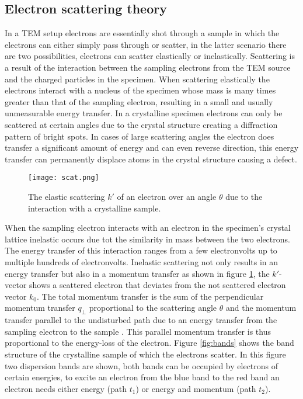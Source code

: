 \subsection{Electron scattering theory}
In a TEM setup electrons are essentially shot through a sample in which the electrons can either simply pass through or scatter, in the latter scenario there are two possibilities, electrons can scatter elastically or inelastically.
Scattering is a result of the interaction between the sampling electrons from the TEM source and the charged particles in the specimen.
When scattering elastically the electrons interact with a nucleus of the specimen whose mass is many times greater than that of the sampling electron, resulting in a small and usually unmeasurable energy transfer. In a crystalline specimen electrons can only be scattered at certain angles due to the crystal structure creating a diffraction pattern of bright spots. In cases of large scattering angles the electron does transfer a significant amount of energy and can even reverse direction, this energy transfer can permanently displace atoms in the crystal structure causing a defect.\cite{Egerton_2008,Egerton2011}\\
%
\begin{figure}[H]
	\centering
	\captionsetup{width=0.9\linewidth}
	\texttt{[image: scat.png]}
	\caption{The elastic scattering $k'$ of an electron over an angle $\theta$ due to the interaction with a crystalline sample.}
	\label{fig:scat}
\end{figure}
%
When the sampling electron interacts with an electron in the specimen's crystal lattice inelastic occurs due tot the similarity in mass between the two electrons. The energy transfer of this interaction ranges from a few electronvolts up to multiple hundreds of electronvolts.
Inelastic scattering not only results in an energy transfer but also in a momentum transfer as shown in figure \ref{fig:scat}, the $k'$-vector shows a scattered electron that deviates from the not scattered electron vector $k_0$.
The total momentum transfer is the sum of the perpendicular momentum transfer $q_{\perp}$ proportional to the scattering angle $\theta$ and the momentum transfer parallel to the undisturbed path due to an energy transfer from the sampling electron to the sample \cite{Egerton_2008,Egerton2011,Bendersky2001}. This parallel momentum transfer is thus proportional to the energy-loss of the electron.
Figure \ref{fig:bands} shows the band structure of the crystalline sample of which the electrons scatter. In this figure two dispersion bands are shown, both bands can be occupied by electrons of certain energies, to excite an electron from the blue band to the red band an electron needs either energy (path $t_1$) or energy and momentum (path $t_2$).
